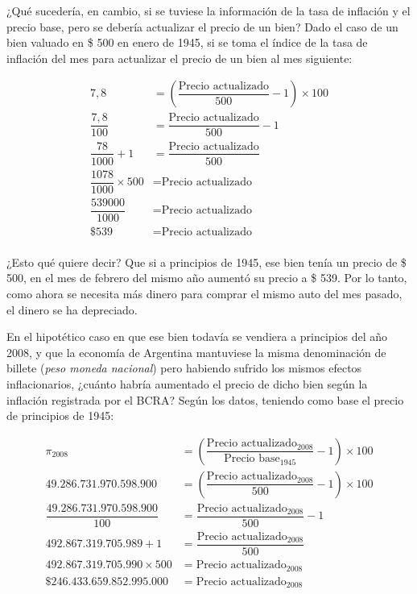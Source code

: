 \documentclass[12pt,a4paper,twoside]{book}
\begin{document}
¿Qué sucedería, en cambio, si se tuviese la información de la tasa de inflación y el precio base, pero se debería actualizar el precio de un bien? Dado el caso de un bien valuado en \$ 500 en enero de 1945, si se toma el índice de la tasa de inflación del mes para actualizar el precio de un bien al mes siguiente:

\begin{align*}
7,8 &= \left( \dfrac{\text{Precio actualizado}}{500} - 1 \right) \times 100 \\
\dfrac{7,8}{100} &= \dfrac{\text{Precio actualizado}}{500} - 1 \\
\dfrac{78}{1000} + 1 &= \dfrac{\text{Precio actualizado}}{500} \\
\dfrac{1078}{1000} \times 500 &= \text{Precio actualizado} \\
\dfrac{539000}{1000} &= \text{Precio actualizado} \\
\text{\$ } 539 &= \text{Precio actualizado} \\
\end{align*}

¿Esto qué quiere decir? Que si a principios de 1945, ese bien tenía un precio de \$ 500, en el mes de febrero del mismo año aumentó su precio a \$ 539. Por lo tanto, como ahora se necesita más dinero para comprar el mismo auto del mes pasado, el dinero se ha depreciado.

En el hipotético caso en que ese bien todavía se vendiera a principios del año 2008, y que la economía de Argentina mantuviese la misma denominación de billete (\textit{peso moneda nacional}) pero habiendo sufrido los mismos efectos inflacionarios, ¿cuánto habría aumentado el precio de dicho bien según la inflación registrada por el BCRA? Según los datos, teniendo como base el precio de principios de 1945:

\begin{align*}
\pi_{2008} &= \left( \dfrac{\text{Precio actualizado}_{2008}}{\text{Precio base}_{1945}} - 1 \right) \times 100 \\
49.286.731.970.598.900 &= \left( \dfrac{\text{Precio actualizado}_{2008}}{500} - 1 \right) \times 100 \\
\dfrac{49.286.731.970.598.900}{100} &= \dfrac{\text{Precio actualizado}_{2008}}{500} - 1 \\
492.867.319.705.989 + 1 &= \dfrac{\text{Precio actualizado}_{2008}}{500} \\
492.867.319.705.990 \times 500 &= \text{Precio actualizado}_{2008} \\
\text{\$ } 246.433.659.852.995.000 &= \text{Precio actualizado}_{2008} \\
\end{align*}
\end{document}
